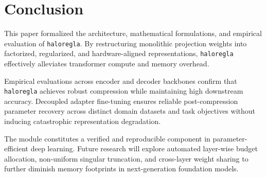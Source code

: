\section{Conclusion}
This paper formalized the architecture, mathematical formulations, and empirical evaluation of \texttt{haloregla}. By restructuring monolithic projection weights into factorized, regularized, and hardware-aligned representations, \texttt{haloregla} effectively alleviates transformer compute and memory overhead.

Empirical evaluations across encoder and decoder backbones confirm that \texttt{haloregla} achieves robust compression while maintaining high downstream accuracy. Decoupled adapter fine-tuning ensures reliable post-compression parameter recovery across distinct domain datasets and task objectives without inducing catastrophic representation degradation.

The module constitutes a verified and reproducible component in parameter-efficient deep learning. Future research will explore automated layer-wise budget allocation, non-uniform singular truncation, and cross-layer weight sharing to further diminish memory footprints in next-generation foundation models.
